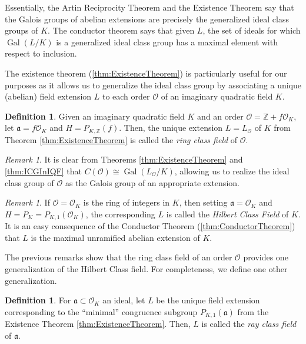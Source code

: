 \documentclass{amsart}
\theoremstyle{definition}
\newtheorem{definition}[thm]{Definition}
\theoremstyle{remark}
\newtheorem{remark}[thm]{Remark}
\numberwithin{equation}{section}
\newcommand{\cO}{\mathcal O}
\newcommand{\fka}{\mathfrak a}
\newcommand{\bbZ}{\mathbb Z}
\DeclareMathOperator{\Gal}{Gal}
\begin{document}
 Essentially, the Artin Reciprocity Theorem and the Existence Theorem say that the Galois groups of abelian extensions are precisely the generalized ideal class groups of $K$. The conductor theorem says that given $L$, the set of ideals for which $\Gal(L/K)$ is a generalized ideal class group has a maximal element with respect to inclusion.
 
 The existence theorem (\ref{thm:ExistenceTheorem}) is particularly useful for our purposes as it allows us to generalize the ideal class group by associating a unique (abelian) field extension $L$ to each order $\cO$ of an imaginary quadratic field $K$. 
 
 \begin{definition}
 Given an imaginary quadratic field $K$ and an order $\cO = \bbZ + f \cO_{K}$, let $\fka = f\cO_{K}$ and $H = P_{K, \bbZ}(f)$. Then, the unique extension $L = L_{\cO}$ of $K$ from Theorem \ref{thm:ExistenceTheorem} is called the \emph{ring class field} of $\cO$.
 \end{definition}
 
 \begin{remark}
 It is clear from Theorems \ref{thm:ExistenceTheorem} and \ref{thm:ICGInIQF} that $C(\cO) \cong \Gal(L_{\cO}/K)$, allowing us to realize the ideal class group of $\cO$ as the Galois group of an appropriate extension.
 \end{remark}
 
 \begin{remark}
 If $\cO = \cO_{K}$ is the ring of integers in $K$, then setting $\fka = \cO_{K}$ and $H = P_{K} = P_{K,1}(\cO_{K})$, the corresponding $L$ is called the \emph{Hilbert Class Field} of $K$. It is an easy consequence of the Conductor Theorem (\ref{thm:ConductorTheorem}) that $L$ is the maximal unramified abelian extension of $K$.
 \end{remark}

 The previous remarks show that the ring class field of an order $\cO$ provides one generalization of the Hilbert Class field. For completeness, we define one other generalization.
 
 \begin{definition} \label{def:RayClassField}
 For $\fka \subset \cO_{K}$ an ideal, let $L$ be the unique field extension  corresponding to the ``minimal'' congruence subgroup $P_{K,1}(\fka)$ from the Existence Theorem \ref{thm:ExistenceTheorem}. Then, $L$ is called the \emph{ray class field} of $\fka$.
 \end{definition}
\end{document}
